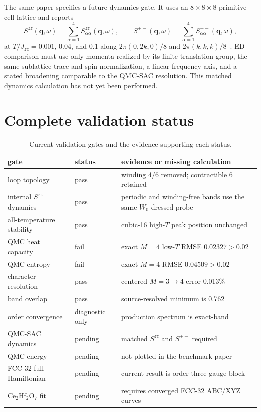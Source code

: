 \documentclass[aps,prl,onecolumn,amsmath,amssymb]{revtex4-2}
\newcommand{\Jzz}{J_{zz}}
\begin{document}
The same paper specifies a future dynamics gate.  It uses an $8\times8\times8$
primitive-cell lattice and reports
\begin{equation}
 S^{zz}(\bm q,\omega)=\sum_{\alpha=1}^4S^{zz}_{\alpha\alpha}(\bm q,\omega),
 \qquad
 S^{+-}(\bm q,\omega)=\sum_{\alpha=1}^4S^{+-}_{\alpha\alpha}(\bm q,\omega),
\end{equation}
at $T/\Jzz=0.001$, 0.04, and 0.1 along
$2\pi(0,2k,0)/8$ and $2\pi(k,k,k)/8$~\cite{Huang2018}.  ED comparison must
use only momenta realized by its finite translation group, the same
sublattice trace and spin normalization, a linear frequency axis, and a
stated broadening comparable to the QMC-SAC resolution.  This matched
dynamics calculation has not yet been performed.

\section{Complete validation status}

\begin{table}[htbp]
\caption{Current validation gates and the evidence supporting each status.}
\label{tab:validation_status}
\centering
\begin{tabular}{lll}
\toprule
gate & status & evidence or missing calculation\\
\midrule
loop topology & pass & winding 4/6 removed; contractible 6 retained\\
internal $S^{zz}$ dynamics & pass & periodic and winding-free bands use the same $W_0$-dressed probe\\
all-temperature stability & pass & cubic-16 high-$T$ peak position unchanged\\
QMC heat capacity & fail & exact $M=4$ low-$T$ RMSE $0.02327>0.02$\\
QMC entropy & fail & exact $M=4$ RMSE $0.04509>0.02$\\
character resolution & pass & centered $M=3\to4$ error 0.013\%\\
band overlap & pass & source-resolved minimum is 0.762\\
order convergence & diagnostic only & production spectrum is exact-band\\
QMC-SAC dynamics & pending & matched $S^{zz}$ and $S^{+-}$ required\\
QMC energy & pending & not plotted in the benchmark paper\\
FCC-32 full Hamiltonian & pending & current result is order-three gauge block\\
Ce$_2$Hf$_2$O$_7$ fit & pending & requires converged FCC-32 ABC/XYZ curves\\
\bottomrule
\end{tabular}
\end{table}
\end{document}
